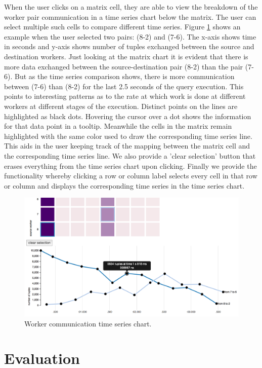 \documentclass{chi2009}
\begin{document}
When the user clicks on a matrix cell, they are able to view the breakdown of the worker pair communication in a 
time series chart below the matrix. The user can select multiple such cells to compare different time 
series. Figure \ref{fig:ts} shows an example when the user selected two pairs: (8-2) and (7-6). The x-axis shows
time in seconds and y-axis shows number of tuples exchanged between the source and destination workers.
Just looking at the matrix chart it is evident that there is more data exchanged between the source-destination pair
(8-2) than the pair (7-6). But as the time series comparison shows, there is more communication between (7-6)
than (8-2) for the last 2.5 seconds of the query execution. This points to interesting patterns as to the rate at which 
work is done at different workers at different stages of the execution. Distinct points on the lines are highlighted as
black dots. Hovering the cursor over a dot shows the information for that data point in a tooltip. Meanwhile the cells 
in the matrix remain highlighted with the same color used to draw the corresponding time series line. This aids in the
user keeping track of the mapping between the matrix cell and the corresponding time series line. We also provide 
a 'clear selection' button that erases everything from the time series chart upon clicking. Finally we provide the
functionality whereby clicking a row or column label selects every cell in that row or column and displays the 
corresponding time series in the time series chart. 

\begin{figure}[!ht]
  \includegraphics[width=\columnwidth]{images/networkVis2}
  \caption{Worker communication time series chart.}
  \label{fig:ts}
\end{figure}


\section{Evaluation}
\label{sec:eval}
\end{document}
